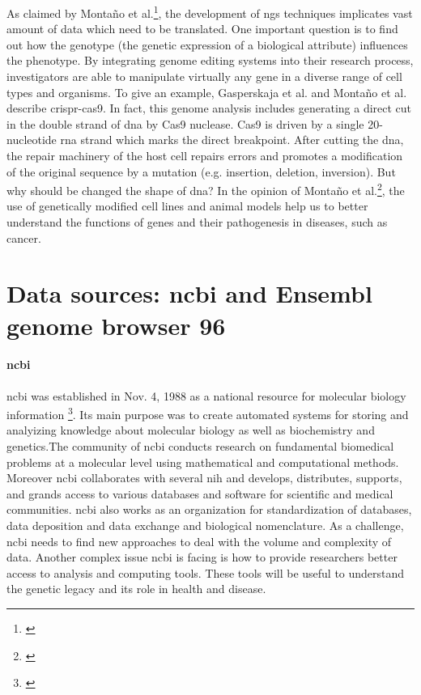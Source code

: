 As claimed by Monta\~{n}o et al.\footnote{\autocite{montano_2018}}, the development of \gls{ngs} techniques implicates vast amount of data which need to be translated. One important question is to find out how the genotype (the genetic expression of a biological attribute) influences the phenotype. By integrating genome editing systems into their research process, investigators are able to manipulate virtually any gene in a diverse range of cell types and organisms.
To give an example, Gasperskaja et al. and Monta\~{n}o et al. describe \gls{crispr-cas9}. In fact, this genome analysis includes generating a direct cut in the double strand of \gls{dna} by Cas9 nuclease. Cas9 is driven by a single 20-nucleotide \gls{rna} strand which marks the direct breakpoint. After cutting the \gls{dna}, the repair machinery of the host cell repairs errors and promotes a modification of the original sequence by a mutation (e.g. insertion, deletion, inversion).
But why should be changed the shape of \gls{dna}? In the opinion of Monta\~{n}o et al.\footnote{\autocite{montano_2018}}, the use of genetically modified cell lines and animal models help us to better understand the functions of genes and their pathogenesis in diseases, such as cancer.
   
\section{Data sources: \gls{ncbi} and Ensembl genome browser 96}\label{datasources}

\paragraph{\gls{ncbi}}

\gls{ncbi} was established in Nov. 4, 1988 as a national resource for molecular biology information \footnote{\autocite{ncbi}}. Its main purpose was to create automated systems for storing and analyizing knowledge about molecular biology as well as biochemistry and genetics.The community of \gls{ncbi} conducts research on fundamental biomedical problems at a molecular level using mathematical and computational methods.
Moreover \gls{ncbi} collaborates with several \gls{nih} and develops, distributes, supports, and grands access to various databases and software for scientific and medical communities.
\gls{ncbi} also works as an organization for standardization of databases, data deposition and data exchange and biological nomenclature.
As a challenge, \gls{ncbi} needs to find new approaches to deal with the volume and complexity of data. Another complex issue \gls{ncbi} is facing is how to provide researchers better access to analysis and computing tools. These tools will be useful to understand the genetic legacy and its role in health and disease.


